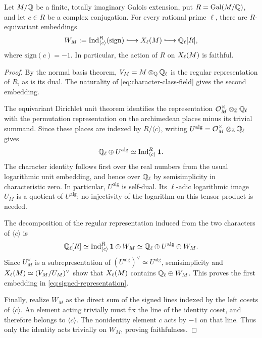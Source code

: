\begin{proposition}\label{prop:signed-representation}
Let $M/\mathbb Q$ be a finite, totally imaginary Galois extension, put
$R=\operatorname{Gal}(M/\mathbb Q)$, and let $c\in R$ be a complex conjugation.
For every rational prime $\ell$, there are $R$-equivariant embeddings
\begin{equation}\label{eq:signed-representation}
 W_M:=\Ind_{\langle c\rangle}^{R}(\mathrm{sign})
 \lhook\joinrel\longrightarrow\X{\ell}{M}
 \lhook\joinrel\longrightarrow\Q_\ell[R],
\end{equation}
where $\mathrm{sign}(c)=-1$.  In particular, the action of $R$ on
$X_{\ell}(M)$ is faithful.
\end{proposition}

\begin{proof}
By the normal basis theorem, $V_M=M\otimes_\mathbb Q\mathbb Q_\ell$ is the
regular representation of $R$, as is its dual.  The naturality of
\eqref{eq:character-class-field} gives the second embedding.

The equivariant Dirichlet unit theorem
\cite[Section~3]{bass1966} identifies the representation
$\mathcal O_M^\times\otimes_\mathbb Z\mathbb Q_\ell$ with the permutation
representation on the archimedean places minus its trivial summand.
Since these places are indexed by $R/\langle c\rangle$, writing
$U^{\mathrm{alg}}=\mathcal O_M^\times\otimes_\mathbb Z\mathbb Q_\ell$ gives
\[
 \mathbb Q_\ell\oplus U^{\mathrm{alg}}
 \simeq\operatorname{Ind}_{\langle c\rangle}^{R}\mathbf1.
\]
The character identity follows first over the real numbers from the
usual logarithmic unit embedding, and hence over $\mathbb Q_\ell$ by
semisimplicity in characteristic zero.  In particular,
$U^{\mathrm{alg}}$ is self-dual.  Its $\ell$-adic logarithmic image
$U_M$ is a quotient of $U^{\mathrm{alg}}$; no injectivity of the
logarithm on this tensor product is needed.

The decomposition of the regular representation induced from the
two characters of $\langle c\rangle$ is
\[
 \mathbb Q_\ell[R]
 \simeq\operatorname{Ind}_{\langle c\rangle}^{R}\mathbf1\oplus W_M
 \simeq\mathbb Q_\ell\oplus U^{\mathrm{alg}}\oplus W_M.
\]
Since $U_M^\vee$ is a subrepresentation of
$(U^{\mathrm{alg}})^\vee\simeq U^{\mathrm{alg}}$, semisimplicity
and $X_{\ell}(M)\simeq(V_M/U_M)^\vee$ show that
$X_{\ell}(M)$ contains $\mathbb Q_\ell\oplus W_M$.  This proves the
first embedding in \eqref{eq:signed-representation}.

Finally, realize $W_M$ as the direct sum of the signed lines indexed
by the left cosets of $\langle c\rangle$.  An element acting
trivially must fix the line of the identity coset, and therefore
belongs to $\langle c\rangle$.  The nonidentity element $c$ acts
by $-1$ on that line.  Thus only the identity acts trivially on
$W_M$, proving faithfulness.
\end{proof}
